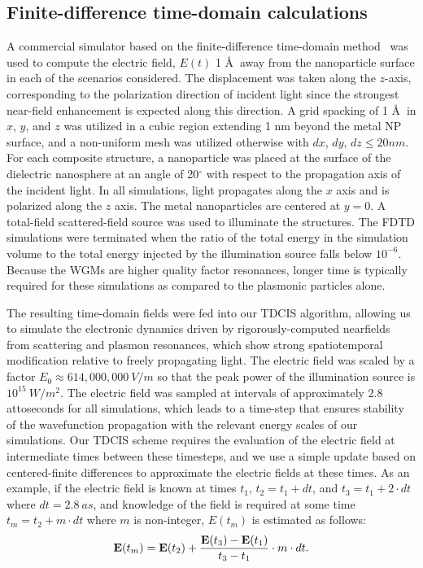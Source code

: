 \documentclass[journal=jpclcd,manuscript=letter]{achemso}
\begin{document}
\subsection{Finite-difference time-domain calculations}
A commercial simulator based on the finite-difference time-domain method~\cite{Lumerical} was used to compute the electric field, $E(t)$
1 \AA $\:$  
away from the nanoparticle surface in each of the scenarios considered.  The displacement
was taken along the $z$-axis, corresponding to the polarization direction of incident light since the strongest
near-field enhancement is expected along this direction.  A grid spacking of 1 \AA $\:$  
in $x$, $y$, and $z$ was utilized
in a cubic region extending 1 nm beyond the metal NP surface, and a non-uniform mesh was utilized otherwise with $dx$, $dy$, $dz \leq 20 nm$.
For each composite structure, a nanoparticle was placed at the surface of the dielectric nanosphere at an angle of
20$^{\circ}$ with respect to the propagation axis of the incident light. In all simulations, light propagates
along the $x$ axis and is polarized along the $z$ axis.  The metal nanoparticles are centered at $y=0$.  
A total-field scattered-field source was used to illuminate the structures.  The FDTD simulations were terminated when the 
ratio of the total energy in the simulation volume to the total energy injected by the illumination source falls below
$10^{-6}$.  Because the WGMs are higher quality factor resonances, longer time is typically required for these simulations
as compared to the plasmonic particles alone.  

The resulting time-domain fields were fed into our TDCIS algorithm, allowing us to simulate the electronic dynamics
driven by rigorously-computed nearfields from scattering and plasmon resonances, which show strong spatiotemporal modification relative
to freely propagating light.  The electric field was scaled by a factor $E_0 \approx 614,000,000 \: V/m$ so that the peak power
of the illumination source is $10^{15} \: W/m^2$.  The electric field was sampled at intervals of approximately 2.8 attoseconds for all simulations, which leads
to a time-step that ensures stability of
the wavefunction propagation with the relevant energy scales of our simulations.  Our TDCIS scheme
requires the evaluation of the electric field at intermediate times between these timesteps, and we use a simple update
based on centered-finite differences to approximate the electric fields at these times.  As an example, if the 
electric field is known at times $t_1$, $t_2 = t_1 + dt$, and $t_3 = t_1 + 2\cdot dt$ where $dt = 2.8 \: as$, and knowledge
of the field is required at some time $t_m = t_2 + m\cdot dt$ where $m$ is non-integer, $E(t_m)$ is estimated as follows: 
\begin{equation}
{\bf E}(t_m) =  {\bf E}(t_2) + \frac{{\bf E}(t_3)-{\bf E}(t_1) }{t_3 - t_1 } \cdot m\cdot dt.
\end{equation}
\end{document}
